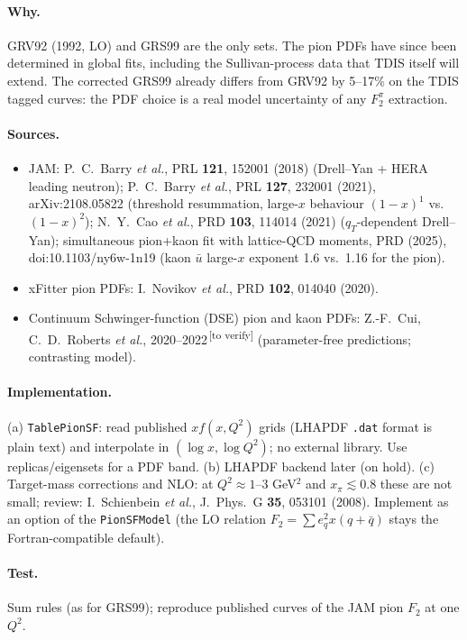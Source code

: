 \documentclass[11pt,a4paper]{article}
\newcommand{\code}[1]{\texttt{#1}}
\newcommand{\verify}{\textsuperscript{\,[to verify]}}
\begin{document}
\paragraph{Why.} GRV92 (1992, LO) and GRS99 are the only sets.  The pion PDFs
have since been determined in global fits, including the Sullivan-process
data that TDIS itself will extend.  The corrected GRS99 already differs from
GRV92 by 5--17\% on the TDIS tagged curves: the PDF choice is a real model
uncertainty of any $F_2^\pi$ extraction.

\paragraph{Sources.}
\begin{itemize}
\item JAM: P.~C.~Barry \textit{et al.}, PRL \textbf{121}, 152001 (2018)
  (Drell--Yan + HERA leading neutron);
  P.~C.~Barry \textit{et al.}, PRL \textbf{127}, 232001 (2021),
  arXiv:2108.05822 (threshold resummation, large-$x$ behaviour
  $(1-x)^1$ vs.\ $(1-x)^2$);
  N.~Y.~Cao \textit{et al.}, PRD \textbf{103}, 114014 (2021)
  ($q_T$-dependent Drell--Yan);
  simultaneous pion+kaon fit with lattice-QCD moments, PRD (2025),
  doi:10.1103/ny6w-1n19 (kaon $\bar u$ large-$x$ exponent 1.6 vs.\ 1.16 for
  the pion).
\item xFitter pion PDFs: I.~Novikov \textit{et al.}, PRD \textbf{102}, 014040 (2020).
\item Continuum Schwinger-function (DSE) pion and kaon PDFs: Z.-F.~Cui, C.~D.~Roberts
  \textit{et al.}, 2020--2022\verify{} (parameter-free predictions; contrasting
  model).
\end{itemize}

\paragraph{Implementation.}
(a) \code{TablePionSF}: read published $x f(x,Q^2)$ grids (LHAPDF \code{.dat}
format is plain text) and interpolate in $(\log x,\log Q^2)$; no external
library.  Use replicas/eigensets for a PDF band.
(b) LHAPDF backend later (on hold).
(c) Target-mass corrections and NLO: at $Q^2\approx1$--3 GeV$^2$ and
$x_\pi\lesssim0.8$ these are not small; review: I.~Schienbein \textit{et al.},
J.~Phys.~G \textbf{35}, 053101 (2008).  Implement as an option of the
\code{PionSFModel} (the LO relation $F_2=\sum e_q^2x(q+\bar q)$ stays the
Fortran-compatible default).
\paragraph{Test.} Sum rules (as for GRS99); reproduce published curves of the
JAM pion $F_2$ at one $Q^2$.
\end{document}
